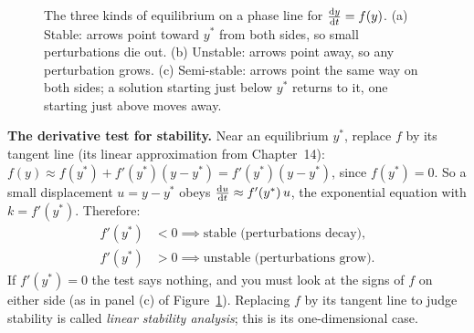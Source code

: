 \begin{figure}[htbp]
\caption{The three kinds of equilibrium on a phase line for $\frac{\mathrm{d} y}{\mathrm{d} t}=f(y)$.
(a) Stable: arrows point toward $y^*$ from both sides, so small perturbations die out.
(b) Unstable: arrows point away, so any perturbation grows.
(c) Semi-stable: arrows point the same way on both sides; a solution starting
just below $y^*$ returns to it, one starting just above moves away.}
\label{ch37:fig-stability-archetypes}
\end{figure}

\begin{focusbox}
\textbf{The derivative test for stability.} Near an equilibrium $y^*$, replace $f$
by its tangent line (its linear approximation from Chapter~14):
$f(y)\approx f(y^*)+f'(y^*)(y-y^*) = f'(y^*)(y-y^*)$, since $f(y^*)=0$. So a small displacement
$u=y-y^*$ obeys $\frac{\mathrm{d} u}{\mathrm{d} t}\approx f'(y^*)\,u$, the exponential equation with
$k=f'(y^*)$. Therefore:
\[
\begin{aligned}
  f'(y^*) &< 0 \implies \text{stable (perturbations decay)}, \\
  f'(y^*) &> 0 \implies \text{unstable (perturbations grow)}.
\end{aligned}
\]
If $f'(y^*)=0$ the test says nothing, and you must look at the signs of $f$ on
either side (as in panel (c) of Figure~\ref{ch37:fig-stability-archetypes}).
Replacing $f$ by its tangent line to judge stability is called \emph{linear
stability analysis}; this is its one-dimensional case.
\end{focusbox}


